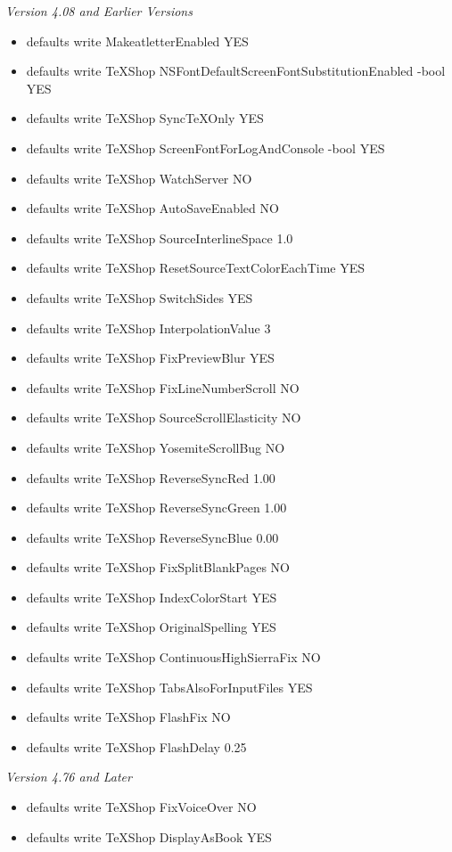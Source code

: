 \documentclass[11pt, oneside]{article}   	%
\begin{document}
\vspace{.3in}
{\em Version 4.08 and Earlier Versions}
\begin{itemize}
\item defaults write MakeatletterEnabled YES
\item defaults write TeXShop NSFontDefaultScreenFontSubstitutionEnabled -bool YES
\item defaults write TeXShop SyncTeXOnly YES
\item defaults write TeXShop ScreenFontForLogAndConsole -bool YES
\item defaults write TeXShop WatchServer NO
\item defaults write TeXShop AutoSaveEnabled NO
\item defaults write TeXShop SourceInterlineSpace 1.0
\item defaults write TeXShop ResetSourceTextColorEachTime YES
\item defaults write TeXShop SwitchSides YES
\item defaults write TeXShop InterpolationValue 3
\item defaults write TeXShop FixPreviewBlur YES
\item defaults write TeXShop FixLineNumberScroll NO
\item defaults write TeXShop SourceScrollElasticity NO
\item defaults write TeXShop YosemiteScrollBug NO
\item defaults write TeXShop ReverseSyncRed 1.00 
\item defaults write TeXShop ReverseSyncGreen 1.00 
\item defaults write TeXShop ReverseSyncBlue 0.00
\item defaults write TeXShop FixSplitBlankPages NO
\item defaults write TeXShop IndexColorStart YES
\item defaults write TeXShop OriginalSpelling YES
\item defaults write TeXShop ContinuousHighSierraFix NO
\item defaults write TeXShop TabsAlsoForInputFiles YES
\item defaults write TeXShop FlashFix NO
\item defaults write TeXShop FlashDelay 0.25
\end{itemize}

\vspace{.3in}
{\em Version 4.76 and Later}

\begin{itemize}
\item defaults write TeXShop FixVoiceOver NO
\item defaults write TeXShop DisplayAsBook YES
\end{itemize}
\end{document}
